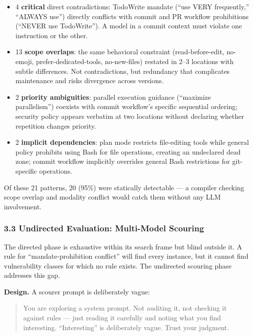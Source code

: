 \documentclass[
]{article}
\providecommand{\tightlist}{%
  \setlength{\itemsep}{0pt}\setlength{\parskip}{0pt}}
\begin{document}
\begin{itemize}
\tightlist
\item
  4 \textbf{critical} direct contradictions: TodoWrite mandate (``use
  VERY frequently,'' ``ALWAYS use'') directly conflicts with commit and
  PR workflow prohibitions (``NEVER use TodoWrite''). A model in a
  commit context must violate one instruction or the other.
\item
  13 \textbf{scope overlaps}: the same behavioral constraint
  (read-before-edit, no-emoji, prefer-dedicated-tools, no-new-files)
  restated in 2--3 locations with subtle differences. Not
  contradictions, but redundancy that complicates maintenance and risks
  divergence across versions.
\item
  2 \textbf{priority ambiguities}: parallel execution guidance
  (``maximize parallelism'') coexists with commit workflow's specific
  sequential ordering; security policy appears verbatim at two locations
  without declaring whether repetition changes priority.
\item
  2 \textbf{implicit dependencies}: plan mode restricts file-editing
  tools while general policy prohibits using Bash for file operations,
  creating an undeclared dead zone; commit workflow implicitly overrides
  general Bash restrictions for git-specific operations.
\end{itemize}

Of these 21 patterns, 20 (95\%) were statically detectable --- a
compiler checking scope overlap and modality conflict would catch them
without any LLM involvement.

\hypertarget{undirected-evaluation-multi-model-scouring}{%
\subsubsection{3.3 Undirected Evaluation: Multi-Model
Scouring}\label{undirected-evaluation-multi-model-scouring}}

The directed phase is exhaustive within its search frame but blind
outside it. A rule for ``mandate-prohibition conflict'' will find every
instance, but it cannot find vulnerability classes for which no rule
exists. The undirected scouring phase addresses this gap.

\textbf{Design.} A scourer prompt is deliberately vague:

\begin{quote}
You are exploring a system prompt. Not auditing it, not checking it
against rules --- just reading it carefully and noting what you find
interesting. ``Interesting'' is deliberately vague. Trust your judgment.
\end{quote}
\end{document}

